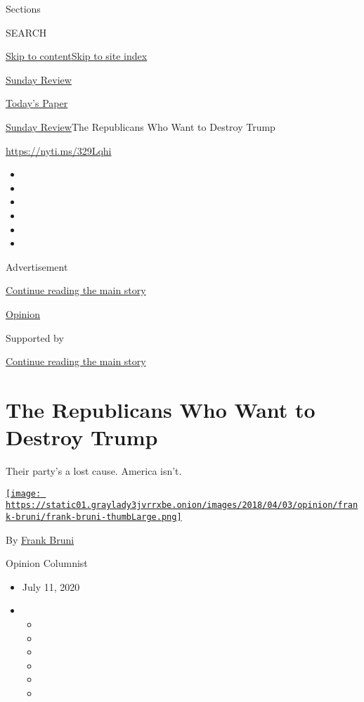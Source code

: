Sections

SEARCH

\protect\hyperlink{site-content}{Skip to
content}\protect\hyperlink{site-index}{Skip to site index}

\href{https://www.nytimes3xbfgragh.onion/section/opinion/sunday}{Sunday
Review}

\href{https://myaccount.nytimes3xbfgragh.onion/auth/login?response_type=cookie\&client_id=vi}{}

\href{https://www.nytimes3xbfgragh.onion/section/todayspaper}{Today's
Paper}

\href{/section/opinion/sunday}{Sunday Review}\textbar{}The Republicans
Who Want to Destroy Trump

\url{https://nyti.ms/329Lqhi}

\begin{itemize}
\item
\item
\item
\item
\item
\item
\end{itemize}

Advertisement

\protect\hyperlink{after-top}{Continue reading the main story}

\href{/section/opinion}{Opinion}

Supported by

\protect\hyperlink{after-sponsor}{Continue reading the main story}

\hypertarget{the-republicans-who-want-to-destroy-trump}{%
\section{The Republicans Who Want to Destroy
Trump}\label{the-republicans-who-want-to-destroy-trump}}

Their party's a lost cause. America isn't.

\href{https://www.nytimes3xbfgragh.onion/by/frank-bruni}{\texttt{[image: https://static01.graylady3jvrrxbe.onion/images/2018/04/03/opinion/frank-bruni/frank-bruni-thumbLarge.png]}}

By \href{https://www.nytimes3xbfgragh.onion/by/frank-bruni}{Frank Bruni}

Opinion Columnist

\begin{itemize}
\item
  July 11, 2020
\item
  \begin{itemize}
  \item
  \item
  \item
  \item
  \item
  \item
  \end{itemize}
\end{itemize}

